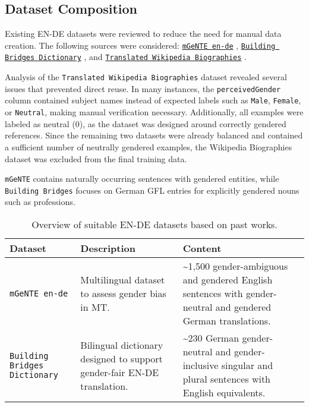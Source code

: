     \subsection{Dataset Composition}
    Existing EN-DE datasets were reviewed to reduce the need for manual data creation. The following sources were considered: \texttt{\href{https://huggingface.co/datasets/FBK-MT/mGeNTE}{mGeNTE en-de}} \parencite{savoldiMGeNTEMultilingualResource2025}, \texttt{\href{https://github.com/g8a9/building-bridges-gender-fair-german-mt}{Building Bridges Dictionary}} \parencite{lardelliBuildingBridgesDataset2024}, and \texttt{\href{https://research.google/blog/a-dataset-for-studying-gender-bias-in-translation/}{Translated Wikipedia Biographies}} \parencite{stellaDatasetStudyingGender2021}.

    Analysis of the \texttt{Translated Wikipedia Biographies} dataset revealed several issues that prevented direct reuse. In many instances, the \texttt{perceivedGender} column contained subject names instead of expected labels such as \texttt{Male}, \texttt{Female}, or \texttt{Neutral}, making manual verification necessary. Additionally, all examples were labeled as neutral (0), as the dataset was designed around correctly gendered references. Since the remaining two datasets were already balanced and contained a sufficient number of neutrally gendered examples, the Wikipedia Biographies dataset was excluded from the final training data.

    \texttt{mGeNTE} contains naturally occurring sentences with gendered entities, while \texttt{Building Bridges} focuses on German GFL entries for explicitly gendered nouns such as professions. 

\begin{table}[ht!]
    \centering
    \renewcommand{\arraystretch}{1.3}
    \begin{tabularx}{\textwidth}{|>{\raggedright\arraybackslash}X|>{\raggedright\arraybackslash}X|>{\raggedright\arraybackslash}X|}
    \hline
    \textbf{Dataset} & \textbf{Description} & \textbf{Content} \\ \hline
    \texttt{mGeNTE en-de} \parencite{savoldiMGeNTEMultilingualResource2025} & Multilingual dataset to assess gender bias in MT. & \textasciitilde1,500 gender-ambiguous and gendered English sentences with gender-neutral and gendered German translations. \\ \hline
    \texttt{Building Bridges Dictionary} \parencite{lardelliBuildingBridgesDataset2024} & Bilingual dictionary designed to support gender-fair EN-DE translation. & \textasciitilde230 German gender-neutral and gender-inclusive singular and plural sentences with English equivalents. \\ \hline
    \end{tabularx}
    \caption{Overview of suitable EN-DE datasets based on past works.}
    \label{tab:available_datasets}
\end{table}

